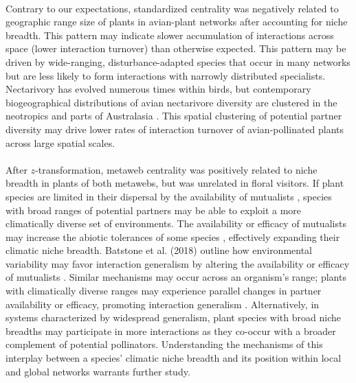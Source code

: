 \paragraph*{}
Contrary to our expectations, standardized centrality was negatively related to geographic range size of plants in avian-plant networks after accounting for niche breadth. This pattern may indicate slower accumulation of interactions across space (lower interaction turnover) than otherwise expected. This pattern may be driven by wide-ranging, disturbance-adapted species that occur in many networks but are less likely to form interactions with narrowly distributed specialists. Nectarivory has evolved numerous times within birds, but contemporary biogeographical distributions of avian nectarivore diversity are clustered in the neotropics and parts of Australasia \parencite{kissling2012bird}. This spatial clustering of potential partner diversity may drive lower rates of interaction turnover of avian-pollinated plants across large spatial scales. 

\paragraph*{}
After $z$-transformation, metaweb centrality was positively related to niche breadth in plants of both metawebs, but was unrelated in floral visitors. If plant species are limited in their dispersal by the availability of mutualists \parencite{warren2014mutualism, duffy2017specialized}, species with broad ranges of potential partners may be able to exploit a more climatically diverse set of environments. The availability or efficacy of mutualists may increase the abiotic tolerances of some species \parencite{warren2014mutualism, fowler2023geographic}, effectively expanding their climatic niche breadth. Batstone et al. (2018) outline how environmental variability may favor interaction generalism by altering the availability or efficacy of mutualists \parencite{batstone2018using}. Similar mechanisms may occur across an organism's range; plants with climatically diverse ranges may experience parallel changes in partner availability or efficacy, promoting interaction generalism \parencite{hurtado2024generalism}. Alternatively, in systems characterized by widespread generalism, plant species with broad niche breadths may participate in more interactions as they co-occur with a broader complement of potential pollinators. Understanding the mechanisms of this interplay between a species' climatic niche breadth and its position within local and global networks warrants further study. 

